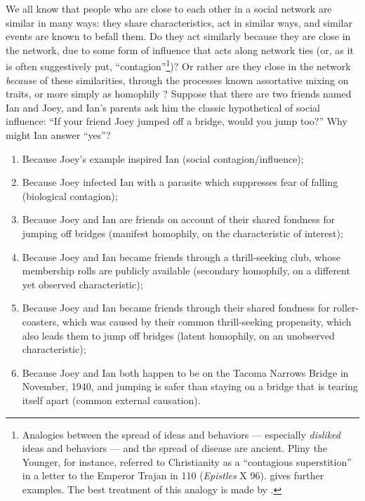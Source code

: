 \documentclass{article}
\begin{document}
\begin{multicols}{2}
We all know that people who are close to each other in a social network are
similar in many ways: they share characteristics, act in similar ways, and
similar events are known to befall them.  Do they act similarly because they
are close in the network, due to some form of influence that acts along network
ties (or, as it is often suggestively put, ``contagion''\footnote{Analogies
  between the spread of ideas and behaviors --- especially {\em disliked} ideas
  and behaviors --- and the spread of disease are ancient.  Pliny the Younger,
  for instance, referred to Christianity as a ``contagious superstition'' in a
  letter to the Emperor Trajan in 110 ({\em Epistles} X 96).
  \citet{Siegfried-germs-and-ideas} gives further examples.  The best treatment
  of this analogy is made by \citet{Sperber-explaining}.})?  Or rather are they
close in the network {\em because} of these similarities, through the processes
known assortative mixing on traits, or more simply as homophily
\citep{Birds-of-a-Feather-review}?  Suppose that there are two friends named
Ian and Joey, and Ian's parents ask him the classic hypothetical of social
influence: ``If your friend Joey jumped off a bridge, would you jump too?'' Why 
might Ian answer ``yes''?
\begin{enumerate}
\item Because Joey's example inspired Ian (social contagion/influence);
\item Because Joey infected Ian with a parasite which suppresses fear of
  falling (biological contagion);
\item Because Joey and Ian are friends on account of their shared fondness for
  jumping off bridges (manifest homophily, on the characteristic of interest);
\item Because Joey and Ian became friends through a thrill-seeking club, whose
  membership rolls are publicly available (secondary homophily, on a different
  yet observed characteristic);
\item Because Joey and Ian became friends through their shared fondness for
  roller-coasters, which was caused by their common thrill-seeking propensity,
  which also leads them to jump off bridges (latent homophily, on an unobserved 
  characteristic); 
\item Because Joey and Ian both happen to be on the Tacoma Narrows Bridge in
  November, 1940, and jumping is safer than staying on a bridge that is tearing
  itself apart (common external causation).
\end{enumerate}


\end{multicols}
\end{document}
